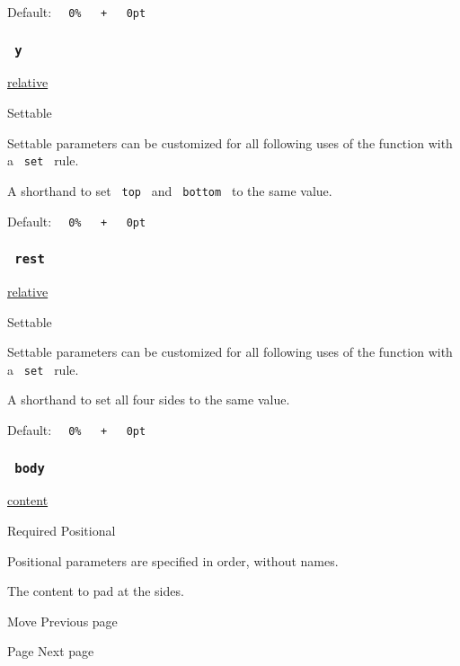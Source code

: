 Default:
\texttt{\ }{\texttt{\ 0\%\ }}\texttt{\ }{\texttt{\ +\ }}\texttt{\ }{\texttt{\ 0pt\ }}\texttt{\ }

\subsubsection{\texorpdfstring{\texttt{\ y\ }}{ y }}\label{parameters-y}

\href{/docs/reference/layout/relative/}{relative}

{{ Settable }}

\label{parameters-y-settable-tooltip}
Settable parameters can be customized for all following uses of the
function with a \texttt{\ set\ } rule.

A shorthand to set \texttt{\ top\ } and \texttt{\ bottom\ } to the same
value.

Default:
\texttt{\ }{\texttt{\ 0\%\ }}\texttt{\ }{\texttt{\ +\ }}\texttt{\ }{\texttt{\ 0pt\ }}\texttt{\ }

\subsubsection{\texorpdfstring{\texttt{\ rest\ }}{ rest }}\label{parameters-rest}

\href{/docs/reference/layout/relative/}{relative}

{{ Settable }}

\label{parameters-rest-settable-tooltip}
Settable parameters can be customized for all following uses of the
function with a \texttt{\ set\ } rule.

A shorthand to set all four sides to the same value.

Default:
\texttt{\ }{\texttt{\ 0\%\ }}\texttt{\ }{\texttt{\ +\ }}\texttt{\ }{\texttt{\ 0pt\ }}\texttt{\ }

\subsubsection{\texorpdfstring{\texttt{\ body\ }}{ body }}\label{parameters-body}

\href{/docs/reference/foundations/content/}{content}

{Required} {{ Positional }}

\label{parameters-body-positional-tooltip}
Positional parameters are specified in order, without names.

The content to pad at the sides.

\href{/docs/reference/layout/move/}{\pandocbounded{}}

{ Move } { Previous page }

\href{/docs/reference/layout/page/}{\pandocbounded{}}

{ Page } { Next page }
